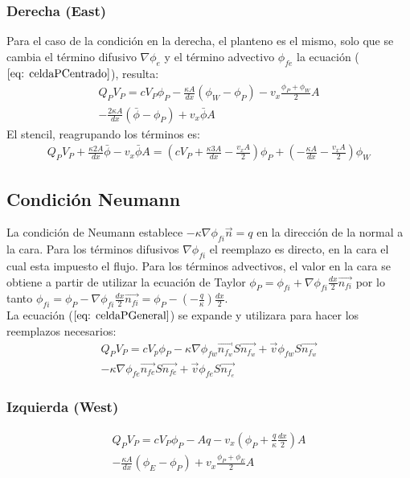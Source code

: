 \documentclass{article}
\begin{document}
    \subsubsection{Derecha (East)}   
        Para el caso de la condición en la derecha, el planteno es el mismo, solo que se cambia el término difusivo $\nabla \phi_e$  y el término advectivo $\phi_{fe}$ la ecuación ($\ref{eq: celdaPCentrado}$), resulta:
        \begin{multline*}
    	    Q_P V_P = c  V_P \phi_P - \frac{\kappa A}{dx} \left( \phi_W - \phi_P \right) - v_x \frac{\phi_P +  \phi_W}{2} A \\ 
    	        - \frac{2 \kappa A}{dx} \left( \bar{\phi} - \phi_P \right) + v_x \bar{\phi} A
        \end{multline*}
       El stencil, reagrupando los términos es: 
        \begin{multline}
    	    Q_P V_P + \frac{\kappa 2 A}{dx} \bar{\phi} - v_x \bar{\phi} A = (c  V_P  + \frac{\kappa 3 A}{dx} - \frac{v_x A}{2}) \phi_P 
    	    + ( -\frac{\kappa A}{dx} - \frac{v_x A}{2}) \phi_W
    	    \label{eq:stencilDirE}
        \end{multline}
    \subsection{Condición Neumann}
        La condición de Neumann establece $-\kappa \nabla \phi_{fi} \vec{n} = \textit{q}$ en la dirección de la normal a la cara. Para los términos difusivos $\nabla \phi_{fi}$ el reemplazo es directo, en la cara el cual esta impuesto el flujo. Para los términos advectivos, el valor en la cara se obtiene a partir de utilizar la ecuación de Taylor $\phi_P = \phi_{fi} + \nabla \phi_{fi} \frac{dx}{2} \vec{n_{fi}}$ por lo tanto  $\phi_{fi} = \phi_P - \nabla \phi_{fi} \frac{dx}{2} \vec{n_{fi}} = \phi_P - (-\frac{q}{\kappa}) \frac{dx}{2}$. 
       \\ 
       La ecuación ($\ref{eq: celdaPGeneral}$) se expande y utilizara para hacer los reemplazos necesarios:
     \begin{multline}
        Q_P V_P = c V_p\phi_P  - \kappa \nabla \phi_{fw}   \vec{n_{f_w}} S \vec{n_{f_w}} + \vec{v}\phi_{fw} S \vec{n_{f_w}} \\
        - \kappa \nabla \phi_{fe} \vec{n_{fe}} S \vec{n_{fe}} + \vec{v}\phi_{fe} S \vec{n_{f_e}}
        \label{eq: generalExpandida}
    \end{multline}   
        \subsubsection{Izquierda (West)}
        \begin{multline*}
    	    Q_P V_P = c  V_P \phi_P - A q - v_x 
    	    (\phi_P  +  \frac{q}{\kappa} \frac{dx}{2})A \\ 
    	        - \frac{\kappa A}{dx} \left( \phi_E - \phi_P \right) + v_x \frac{\phi_P +  \phi_E}{2} A
        \end{multline*}
        
\end{document}
